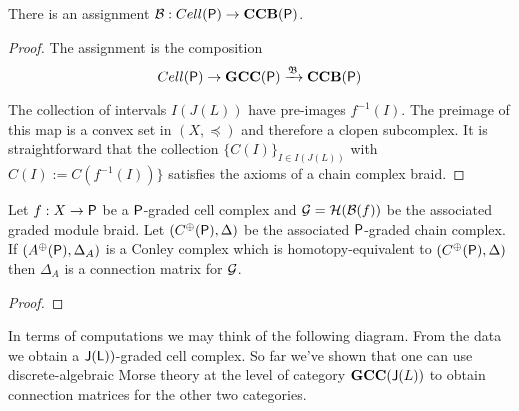 \begin{prop}
There is an assignment ${\mathcal B}:Cell({\mathsf P})\to {\bf CCB}({\mathsf P})$.
\end{prop}
\begin{proof}

The assignment is the composition $$Cell({\mathsf P})\to {\bf GCC({\mathsf P})} \xrightarrow{\mathfrak{B}} {\bf CCB}({\mathsf P})$$


The collection of intervals $I(J(L))$ have pre-images $f^{-1}(I)$.  The preimage of this map is a convex set in $(X,\preceq)$ and therefore a clopen subcomplex.   It is straightforward that the collection $\{C(I)\}_{I\in I(J(L))}$ with $C(I) := C(f^{-1}(I))\}$ satisfies the axioms of a chain complex braid. 
\end{proof}





\begin{thm}
Let $f:X\to {\mathsf P}$ be a ${\mathsf P}$-graded cell complex and ${\mathcal G} = {\mathcal H}({\mathcal B}(f))$ be the associated graded module braid.  Let $(C^\oplus({\mathsf P}),\Delta)$ be the associated ${\mathsf P}$-graded chain complex.  If $(A^\oplus({\mathsf P}),\Delta_A)$ is a Conley complex which is homotopy-equivalent to $(C^\oplus({\mathsf P}),\Delta)$ then $\Delta_A$ is a connection matrix for ${\mathcal G}$.
\end{thm}
\begin{proof}




%
% 
% 
% 

\end{proof}


In terms of computations we may think of the following diagram.  From the data we obtain a ${\mathsf J}({\mathsf L}))$-graded cell complex.  So far we've shown that one can use discrete-algebraic Morse theory at the level of category ${\bf GCC}({\mathsf J}(L))$ to obtain connection matrices for the other two categories.

